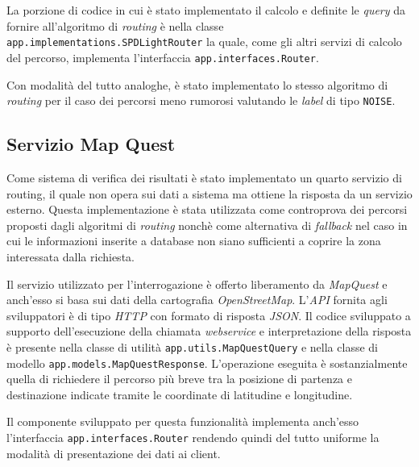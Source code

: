 La porzione di codice in cui è stato implementato il calcolo e definite le \emph{query} da fornire all'algoritmo di \emph{routing} è nella classe \texttt{app.\-implementations.\-SPDLightRouter} la quale, come gli altri servizi di calcolo del percorso, implementa l'interfaccia \texttt{app.\-interfaces.\-Router}.

Con modalità del tutto analoghe, è stato implementato lo stesso algoritmo di \emph{routing} per il caso dei percorsi meno rumorosi valutando le \emph{label} di tipo \texttt{NOISE}.

\subsection{Servizio Map Quest}
Come sistema di verifica dei risultati è stato implementato un quarto servizio di routing, il quale non opera sui dati a sistema ma ottiene la risposta da un servizio esterno. Questa implementazione è stata utilizzata come controprova dei percorsi proposti dagli algoritmi di \emph{routing} nonchè come alternativa di \emph{fallback} nel caso in cui le informazioni inserite a database non siano sufficienti a coprire la zona interessata dalla richiesta.

Il servizio utilizzato per l'interrogazione è offerto liberamento da \emph{MapQuest} e anch'esso si basa sui dati della cartografia \emph{OpenStreetMap}. L'\emph{API} fornita agli sviluppatori è di tipo \emph{HTTP} con formato di risposta \emph{JSON}. Il codice sviluppato a supporto dell'esecuzione della chiamata \emph{webservice} e interpretazione della risposta è presente nella classe di utilità \texttt{app.\-utils.\-MapQuestQuery} e nella classe di modello \texttt{app.\-models.\-MapQuestResponse}. L'operazione eseguita è sostanzialmente quella di richiedere il percorso più breve tra la posizione di partenza e destinazione indicate tramite le coordinate di latitudine e longitudine.

Il componente sviluppato per questa funzionalità implementa anch'esso l'interfaccia \texttt{app.\-interfaces.\-Router} rendendo quindi del tutto uniforme la modalità di presentazione dei dati ai client.
